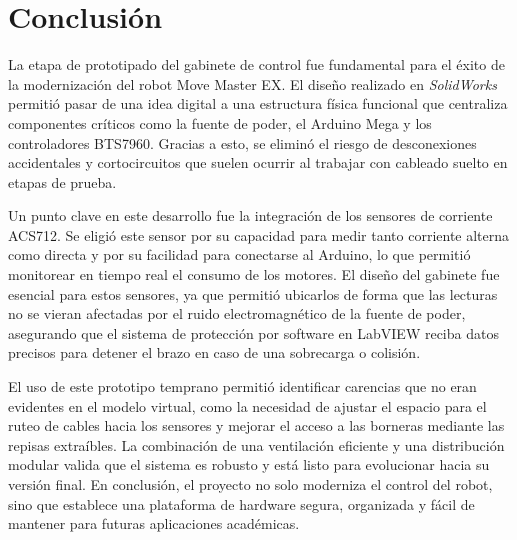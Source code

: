 \chapter{Conclusión}
\lineaLateral

La etapa de prototipado del gabinete de control fue fundamental para el éxito de la modernización del robot Move Master EX. El diseño realizado en \textit{SolidWorks} permitió pasar de una idea digital a una estructura física funcional que centraliza componentes críticos como la fuente de poder, el Arduino Mega y los controladores BTS7960. Gracias a esto, se eliminó el riesgo de desconexiones accidentales y cortocircuitos que suelen ocurrir al trabajar con cableado suelto en etapas de prueba.

Un punto clave en este desarrollo fue la integración de los sensores de corriente ACS712. Se eligió este sensor por su capacidad para medir tanto corriente alterna como directa y por su facilidad para conectarse al Arduino, lo que permitió monitorear en tiempo real el consumo de los motores. El diseño del gabinete fue esencial para estos sensores, ya que permitió ubicarlos de forma que las lecturas no se vieran afectadas por el ruido electromagnético de la fuente de poder, asegurando que el sistema de protección por software en LabVIEW reciba datos precisos para detener el brazo en caso de una sobrecarga o colisión.

El uso de este prototipo temprano permitió identificar carencias que no eran evidentes en el modelo virtual, como la necesidad de ajustar el espacio para el ruteo de cables hacia los sensores y mejorar el acceso a las borneras mediante las repisas extraíbles. La combinación de una ventilación eficiente y una distribución modular valida que el sistema es robusto y está listo para evolucionar hacia su versión final. En conclusión, el proyecto no solo moderniza el control del robot, sino que establece una plataforma de hardware segura, organizada y fácil de mantener para futuras aplicaciones académicas.